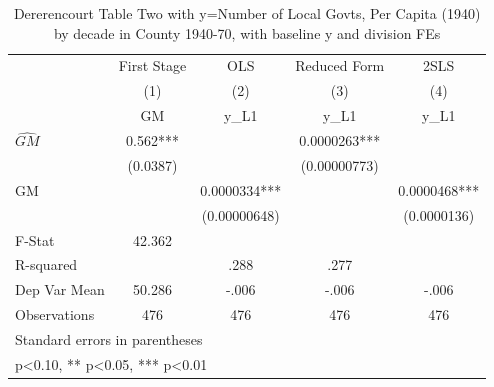 \begin{table}[htbp]\centering
\def\sym#1{\ifmmode^{#1}\else\(^{#1}\)\fi}
\caption{Dererencourt Table Two with y=Number of Local Govts, Per Capita (1940) by decade in County 1940-70, with baseline y and division FEs}
\begin{tabular}{l*{4}{c}}
\toprule
                    & First Stage   &         OLS   &Reduced Form   &        2SLS   \\
                    &\multicolumn{1}{c}{(1)}&\multicolumn{1}{c}{(2)}&\multicolumn{1}{c}{(3)}&\multicolumn{1}{c}{(4)}\\
                    &\multicolumn{1}{c}{GM}&\multicolumn{1}{c}{y\_L1}&\multicolumn{1}{c}{y\_L1}&\multicolumn{1}{c}{y\_L1}\\
\midrule
$\hat{GM}$          &       0.562***&               &   0.0000263***&               \\
                    &    (0.0387)   &               &(0.00000773)   &               \\
\addlinespace
GM                  &               &   0.0000334***&               &   0.0000468***\\
                    &               &(0.00000648)   &               & (0.0000136)   \\
\midrule
F-Stat              &      42.362   &               &               &               \\
R-squared           &               &        .288   &        .277   &               \\
Dep Var Mean        &      50.286   &       -.006   &       -.006   &       -.006   \\
Observations        &         476   &         476   &         476   &         476   \\
\bottomrule
\multicolumn{5}{l}{\footnotesize Standard errors in parentheses}\\
\multicolumn{5}{l}{\footnotesize * p<0.10, ** p<0.05, *** p<0.01}\\
\end{tabular}
\end{table}

